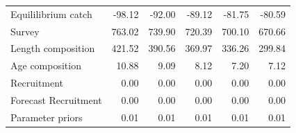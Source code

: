 \documentclass[12pt,]{article}
\begin{document}
\begin{landscape}
\begin{table}[ht]
{\begin{tabular}{lrrrrr}
  Equililibrium catch & -98.12 & -92.00 & -89.12 & -81.75 & -80.59 \\ 
  Survey & 763.02 & 739.90 & 720.39 & 700.10 & 670.66 \\ 
  Length composition & 421.52 & 390.56 & 369.97 & 336.26 & 299.84 \\ 
  Age composition & 10.88 & 9.09 & 8.12 & 7.20 & 7.12 \\ 
  Recruitment & 0.00 & 0.00 & 0.00 & 0.00 & 0.00 \\ 
  Forecast Recruitment & 0.00 & 0.00 & 0.00 & 0.00 & 0.00 \\ 
  Parameter priors & 0.01 & 0.01 & 0.01 & 0.01 & 0.01 \\ 
   \hline
\end{tabular}
}
\end{table}
\end{landscape}

\newpage
\end{document}

